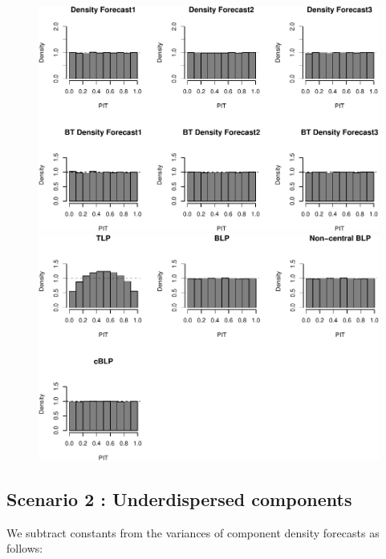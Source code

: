 \documentclass[]{article}
\begin{document}
\begin{figure}[H]

{\centering \includegraphics{Newest_BLPsim_new_files/figure-latex/unnamed-chunk-4-1} \includegraphics{Newest_BLPsim_new_files/figure-latex/unnamed-chunk-4-2} 

}

\end{figure}

\clearpage

\hypertarget{scenario-2-underdispersed-components}{%
\subsection{Scenario 2 : Underdispersed
components}\label{scenario-2-underdispersed-components}}

We subtract constants from the variances of component density forecasts
as follows:
\end{document}
